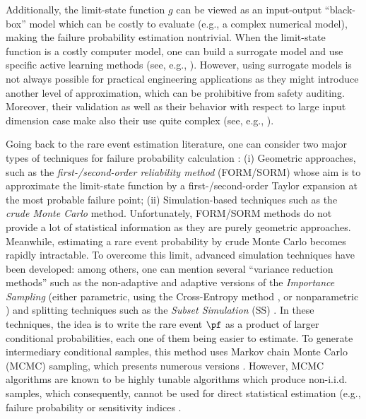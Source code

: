 Additionally, the limit-state function $g$ can be viewed as an input-output ``black-box'' model which can be costly to evaluate (e.g., a complex numerical model), making the failure probability estimation nontrivial. 
When the limit-state function is a costly computer model, one can build a surrogate model and use specific active learning methods (see, e.g., \citet{moustapha_ss_2022}). 
However, using surrogate models is not always possible for practical engineering applications as they might introduce another level of approximation, which can be prohibitive from safety auditing. 
Moreover, their validation as well as their behavior with respect to large input dimension case make also their use quite complex (see, e.g.,  \citep{marrel_iscream_2020}).

Going back to the rare event estimation literature, one can consider two major types of techniques for failure probability calculation \citep{MorioBalesdent2015}: (i) Geometric approaches, such as the \emph{first-/second-order reliability method} (FORM/SORM) whose aim is to approximate the limit-state function by a first-/second-order Taylor expansion at the most probable failure point; (ii) Simulation-based techniques such as the \emph{crude Monte Carlo} method. 
Unfortunately, FORM/SORM methods do not provide a lot of statistical information as they are purely geometric approaches.
Meanwhile, estimating a rare event probability by crude Monte Carlo becomes rapidly intractable. 
To overcome this limit, advanced simulation techniques have been developed: among others, one can mention several ``variance reduction methods'' such as the non-adaptive and adaptive versions of the \emph{Importance Sampling} \citep{RubinsteinKroese1981} (either parametric, using the Cross-Entropy method \citet{NKurtz_JSong_StrucSaf_2013}, or nonparametric \citet{Morio_RESS_2011}) and splitting techniques \citep{cerou2012sequential} such as the \emph{Subset Simulation} (SS) \citet{AuBeck2001}. 
In these techniques, the idea is to write the rare event $\pf$ as a product of larger conditional probabilities, each one of them being easier to estimate. 
To generate intermediary conditional samples, this method uses Markov chain Monte Carlo (MCMC) sampling, which presents numerous versions \citep{Papaioannou_PEM_2015}. 
However, MCMC algorithms are known to be highly tunable algorithms which produce non-i.i.d. samples, which consequently, cannot be used for direct statistical estimation (e.g., failure probability or sensitivity indices \citep{daveiga_iooss_2021}. 

